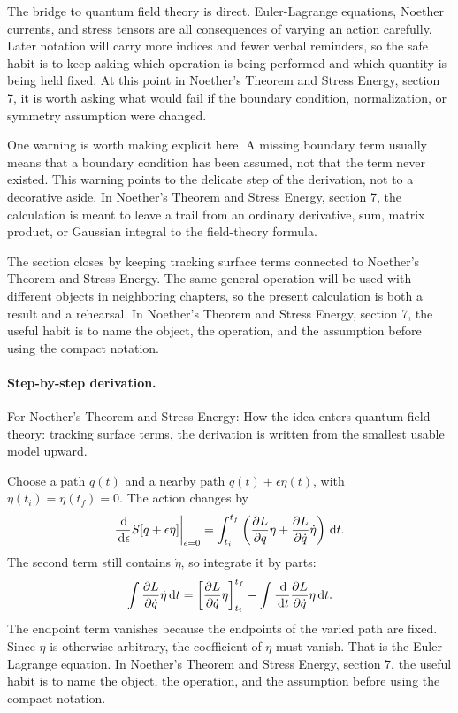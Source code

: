 The bridge to quantum field theory is direct.  Euler-Lagrange equations, Noether currents, and stress tensors are all consequences of varying an action carefully.  Later notation will carry more indices and fewer verbal reminders, so the safe habit is to keep asking which operation is being performed and which quantity is being held fixed.  At this point in Noether's Theorem and Stress Energy, section 7, it is worth asking what would fail if the boundary condition, normalization, or symmetry assumption were changed.

One warning is worth making explicit here.  A missing boundary term usually means that a boundary condition has been assumed, not that the term never existed.  This warning points to the delicate step of the derivation, not to a decorative aside.  In Noether's Theorem and Stress Energy, section 7, the calculation is meant to leave a trail from an ordinary derivative, sum, matrix product, or Gaussian integral to the field-theory formula.

The section closes by keeping tracking surface terms connected to Noether's Theorem and Stress Energy.  The same general operation will be used with different objects in neighboring chapters, so the present calculation is both a result and a rehearsal.  In Noether's Theorem and Stress Energy, section 7, the useful habit is to name the object, the operation, and the assumption before using the compact notation.



\paragraph{Step-by-step derivation.}

For Noether's Theorem and Stress Energy: How the idea enters quantum field theory: tracking surface terms, the derivation is written from the smallest usable model upward.

Choose a path \(q(t)\) and a nearby path \(q(t)+\epsilon\eta(t)\), with \(\eta(t_i)=\eta(t_f)=0\).  The action changes by
\[
  \frac{\,\mathrm d}{\,\mathrm d\epsilon}S[q+\epsilon\eta]\bigg|_{\epsilon=0}
  =
  \int_{t_i}^{t_f}
  \left(
  \frac{\partial L}{\partial q}\eta+\frac{\partial L}{\partial\dot q}\dot\eta
  \right)\,\mathrm d t.
\]
The second term still contains \(\dot\eta\), so integrate it by parts:
\[
  \int \frac{\partial L}{\partial\dot q}\dot\eta\,\mathrm d t
  =
  \left[\frac{\partial L}{\partial\dot q}\eta\right]_{t_i}^{t_f}
  -
  \int \frac{\,\mathrm d}{\,\mathrm d t}\frac{\partial L}{\partial\dot q}\eta\,\mathrm d t.
\]
The endpoint term vanishes because the endpoints of the varied path are fixed.  Since \(\eta\) is otherwise arbitrary, the coefficient of \(\eta\) must vanish.  That is the Euler-Lagrange equation.  In Noether's Theorem and Stress Energy, section 7, the useful habit is to name the object, the operation, and the assumption before using the compact notation.

